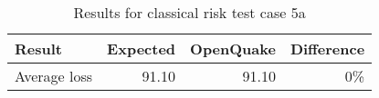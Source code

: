 \begin{table}[htbp]

\centering
\begin{tabular}{ l r r r }

\hline
\rowcolor{anti-flashwhite}
\bf{Result} & \bf{Expected} & \bf{OpenQuake} & \bf{Difference}\\
\hline
Average loss & 91.10 & 91.10 & 0\% \\
\hline
\end{tabular}

\caption{Results for classical risk test case 5a}
\label{tab:result-classical-risk-5a}
\end{table}